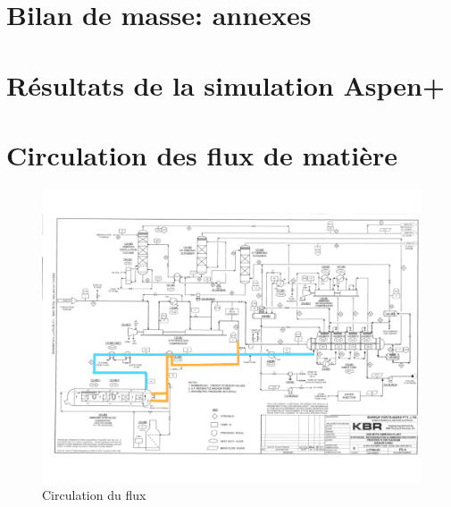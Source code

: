 \chapter{Bilan de masse: annexes}









\chapter{Résultats  de la simulation Aspen+}
\label{Aspen}


\chapter{Circulation des flux de matière}

\label{Annexe Flux}

\begin{figure}[h]
	\begin{center}
	\includegraphics[scale=0.5]{task4/Plan1.png}
	\end{center}
	\caption{Circulation du flux}
	\label{cir1}
\end{figure}

